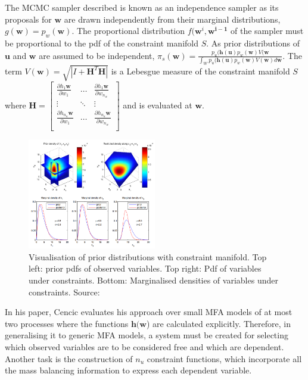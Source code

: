 \documentclass[ %
                    author={Tom Jager},
                supervisor={Dr. Daniel Schien},
                    degree={MEng},
                     title={A Bayesian Inference Engine for UMIS Structured Data},
                  subtitle={},
                      type={research},
                      year={2019} ]{dissertation}
\begin{document}
The MCMC sampler described is known as an independence sampler as its proposals for $\bm{w}$ are drawn independently from their marginal distributions, $g(\bm{w}) = p_w(\bm{w})$. The proportional distribution $f(\bm{w}^{i}, \bm{w^{i-1}}$ of the sampler must be proportional to the pdf of the constraint manifold $S$. As prior distributions of $\bm{u}$ and $\bm{w}$ are assumed to be independent, $\pi_s(\bm{w}) = \frac{p_{u}(\bm{h}(\bm{u}) p_{w}(\bm{w}) V(\bm{w}}{\int_W p_{u}(\bm{h}(\bm{u}) p_{w}(\bm{w}) V(\bm{w}) d\bm{w}}$. The term $V(\bm{w}) = \sqrt{|I + \bm{H}^T\bm{H}|}$ is a Lebesgue measure of the constraint manifold $S$ where $\bm{H} = \begin{bmatrix}
    \frac{\partial h_1{\bm{w}}}{\partial w_1} & \dots & \frac{\partial h_1{\bm{w}}}{\partial w_{n_w}} \\ 
    \vdots & \ddots & \vdots \\
    \frac{\partial h_{n_u}{\bm{w}}}{\partial w_1} & \dots & \frac{\partial h_{n_u}{\bm{w}}}{\partial w_{n_w}} \\
\end{bmatrix}$ and is evaluated at $\bm{w}$.
\begin{figure}[]
\centering
\includegraphics[width=0.5\textwidth]{images/cencic_manifold.png}
\caption{Visualisation of prior distributions with constraint manifold. Top left: prior pdfs of observed variables. Top right: Pdf of variables under constraints. Bottom: Marginalised densities of variables under constraints. Source: \cite{cencic2015general}}
\label{fig:cencic_manifold}
\end{figure}


In his paper, Cencic evaluates his approach over small MFA models of at most two processes where the functions $\bm{h}(\bm{w}$) are calculated explicitly. Therefore, in generalising it to generic MFA models, a system must be created for selecting which observed variables are to be considered free and which are dependent. Another task is the construction of $n_u$ constraint functions, which incorporate all the mass balancing information to express each dependent variable.
\end{document}
